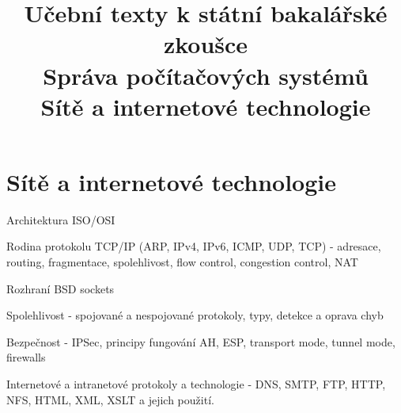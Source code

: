 \clearpage  \clearpage
\title{\LARGE Učební texty k státní bakalářské zkoušce \\ Správa počítačových systémů \\ Sítě a internetové technologie}

\maketitle
\newpage
\setcounter{section}{4}
\section{Sítě a internetové technologie}
\begin{pozadavky}
\begin{pitemize}
\item Architektura ISO/OSI
\item Rodina protokolu TCP/IP (ARP, IPv4, IPv6, ICMP, UDP, TCP) - adresace, routing, fragmentace, spolehlivost, flow control, congestion control, NAT
\item Rozhraní BSD sockets
\item Spolehlivost - spojované a nespojované protokoly, typy, detekce a oprava chyb
\item Bezpečnost - IPSec, principy fungování AH, ESP, transport mode, tunnel mode, firewalls
\item Internetové a intranetové protokoly a technologie - DNS, SMTP, FTP, HTTP, NFS, HTML, XML, XSLT a jejich použití.
\end{pitemize}
\end{pozadavky}








